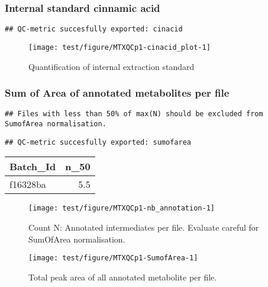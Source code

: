\documentclass[9pt,]{article}
\begin{document}
\subsubsection{Internal standard cinnamic
acid}\label{internal-standard-cinnamic-acid}

\begin{verbatim}
## QC-metric succesfully exported: cinacid
\end{verbatim}

\begin{figure}

{\centering \texttt{[image: test/figure/MTXQCp1-cinacid\_plot-1]} 

}

\caption{Quantification of internal extraction standard}\label{fig:cinacid_plot}
\end{figure}

\subsubsection{Sum of Area of annotated metabolites per
file}\label{sum-of-area-of-annotated-metabolites-per-file}

\begin{verbatim}
## Files with less than 50% of max(N) should be excluded from SumofArea normalisation.
\end{verbatim}

\begin{verbatim}
## QC-metric succesfully exported: sumofarea
\end{verbatim}

\begin{longtable}[]{@{}lr@{}}
\toprule
Batch\_Id & n\_50\tabularnewline
\midrule
\endhead
f16328ba & 5.5\tabularnewline
\bottomrule
\end{longtable}

\begin{figure}

{\centering \texttt{[image: test/figure/MTXQCp1-nb\_annotation-1]} 

}

\caption{Count N: Annotated intermediates per file. Evaluate careful for SumOfArea normalisation.}\label{fig:nb_annotation}
\end{figure}

\begin{figure}

{\centering \texttt{[image: test/figure/MTXQCp1-SumofArea-1]} 

}

\caption{Total peak area of all annotated metabolite per file.}\label{fig:SumofArea}
\end{figure}
\end{document}
